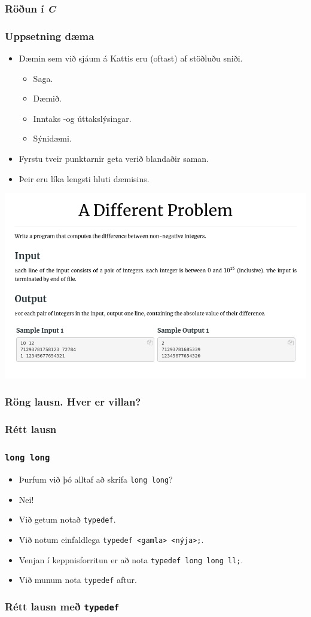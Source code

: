 \documentclass{beamer}
\newcommand\env[2]
{
	\begin{#1}
	#2
	\end{#1}
}
\newcommand\code[1]{\tiny}
\begin{document}
\env{frame}
{
	\frametitle{Röðun í \emph{C}}
	\code{sort.c}
}

\env{frame}
{
	\frametitle{Uppsetning dæma}
	\env{itemize}
	{
		\item<1-> Dæmin sem við sjáum á Kattis eru (oftast) af stöðluðu sniði.
		\env{itemize}
		{
			\item<2-> Saga.
			\item<3-> Dæmið.
			\item<4-> Inntaks -og úttakslýsingar.
			\item<5-> Sýnidæmi.
		}
		\item<6-> Fyrstu tveir punktarnir geta verið blandaðir saman.
		\item<7-> Þeir eru líka lengsti hluti dæmisins.
	}
}
\env{frame}
{
	\includegraphics[scale = 0.38]{daemi}
}

\env{frame}
{
	\frametitle{Röng lausn. Hver er villan?}
	\code{differentint.cpp}
}

\env{frame}
{
	\frametitle{Rétt lausn}
	\code{different.cpp}
}

\env{frame}
{
	\frametitle{\texttt{long long}}
	\env{itemize}
	{
		\item<1-> Þurfum við þó alltaf að skrifa \texttt{long long}?
		\item<2-> Nei!
		\item<3-> Við getum notað \texttt{typedef}.
		\item<4-> Við notum einfaldlega \texttt{typedef <gamla> <nýja>;}.
		\item<5-> Venjan í keppnisforritun er að nota \texttt{typedef long long ll;}.
		\item<6-> Við munum nota \texttt{typedef} aftur.
	}
}

\env{frame}
{
	\frametitle{Rétt lausn með \texttt{typedef}}
	\code{differentll.cpp}
}
\end{document}
